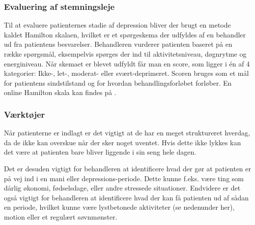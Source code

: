 \subsubsection{Evaluering af stemningsleje}
Til at evaluere patienternes stadie af depression bliver der brugt en metode kaldet Hamilton skalaen, hvilket er et spørgeskema der udfyldes af en behandler ud fra patientens besvarelser. 
Behandleren vurderer patienten baseret på en række spørgsmål, eksempelvis spørges der ind til aktivitetsniveau, døgnrytme og energiniveau.
Når skemaet er blevet udfyldt får man en score, som ligger i én af 4 kategorier: Ikke-, let-, moderat- eller svært-deprimeret. 
Scoren bruges som et mål for patientens sindstilstand og for hvordan behandlingsforløbet forløber.
En online Hamilton skala kan findes på \citet{hamilton}.

\subsubsection{Værktøjer}
Når patienterne er indlagt er det vigtigt at de har en meget struktureret hverdag, da de ikke kan overskue når der sker noget uventet.
Hvis dette ikke lykkes kan det være at patienten bare bliver liggende i sin seng hele dagen.

Det er desuden vigtigt for behandleren at identificere hvad der gør at patienten er på vej ind i en mani eller depressions-periode.
Dette kunne f.eks. være ting som dårlig økonomi, fødselsdage, eller andre stressede situationer.
Endvidere er det også vigtigt for behandleren at identificere hvad der kan få patienten ud af sådan en periode, hvilket kunne være lystbetonede aktiviteter (se nedenunder her), motion eller et regulært søvnmønster.

